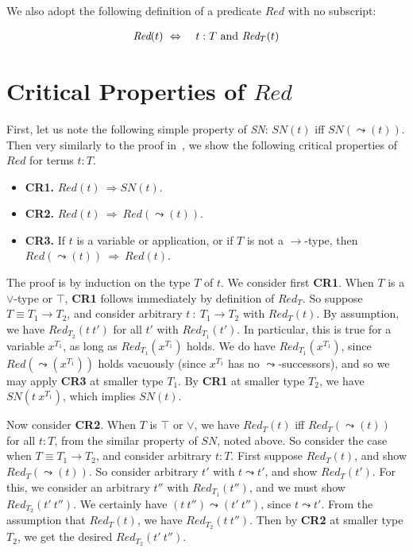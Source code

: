 \documentclass{article}
\newcommand{\red}[0]{\textit{Red}}
\newcommand{\sn}[0]{\textit{SN}}
\newcommand{\To}{\Rightarrow}
\begin{document}
\noindent We also adopt the following definition of a predicate $\red$
with no subscript:

\begin{eqnarray*}
\red(t) &\ \Leftrightarrow\ & t : T\ \textnormal{and}\ \red_{T}(t)
\end{eqnarray*}

\section{Critical Properties of $\red$}
\label{sec:crit}

First, let us note the following simple property of \sn: $\sn(t)$ iff
$\sn(\leadsto(t))$.  Then very similarly to the proof in~\cite{pat},
we show the following critical properties of $\red$ for terms $t:T$.

\begin{itemize}
\item \textbf{CR1.} $\red(t) \ \To \sn(t)$.
\item \textbf{CR2.} $\red(t)\ \To\ \red(\leadsto(t))$.
\item \textbf{CR3.} If $t$ is a variable or application, or if $T$ is
not a $\to$-type, then $\red(\leadsto(t))\ \To\ \red(t)$.
\end{itemize}

The proof is by induction on the type $T$ of $t$.  We consider first
\textbf{CR1}.  When $T$ is a $\vee$-type or $\top$, \textbf{CR1}
follows immediately by definition of $\red_T$.  So suppose $T \equiv
T_1\to T_2$, and consider arbitrary $t\ :\ T_1\to T_2$ with
$\red_{T}(t)$.  By assumption, we have $\red_{T_2}(t\ t')$ for all
$t'$ with $\red_{T_1}(t')$.  In particular, this is true for a
variable $x^{T_1}$, as long as $\red_{T_1}(x^{T_1})$ holds.  We do
have $\red_{T_1}(x^{T_1})$, since $\red(\leadsto(x^{T_1}))$ holds
vacuously (since $x^{T_1}$ has no $\leadsto$-successors), and so we
may apply \textbf{CR3} at smaller type $T_1$.  By \textbf{CR1} at
smaller type $T_2$, we have $\sn(t\ x^{T_1})$, which implies $\sn(t)$.

Now consider \textbf{CR2}.  When $T$ is $\top$ or $\vee$, we have
$\red_T(t)$ iff $\red_T(\leadsto(t))$ for all $t:T$, from the similar
property of $\sn$, noted above.  So consider the case when $T\equiv
T_1\to T_2$, and consider arbitrary $t:T$.  First suppose
$\red_{T}(t)$, and show $\red_T(\leadsto(t))$.  So consider arbitrary
$t'$ with $t\leadsto t'$, and show $\red_T(t')$.  For this, we
consider an arbitrary $t''$ with $\red_{T_1}(t'')$, and we must show
$\red_{T_2}(t'\ t'')$.  We certainly have $(t\ t'')\leadsto (t'\
t'')$, since $t\leadsto t'$.  From the assumption that $\red_{T}(t)$,
we have $\red_{T_2}(t\ t'')$.  Then by \textbf{CR2} at smaller type
$T_2$, we get the desired $\red_{T_2}(t'\ t'')$.  
\end{document}
